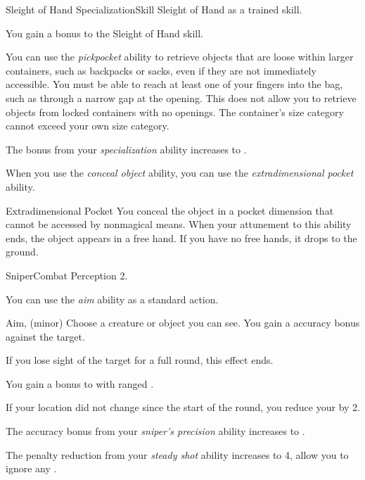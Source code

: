     \begin{feat}{Sleight of Hand Specialization}{Skill}
        \featpre Sleight of Hand as a trained skill.

         You gain a  bonus to the Sleight of Hand skill.

         You can use the \textit{pickpocket} ability to retrieve objects that are loose within larger containers, such as backpacks or sacks, even if they are not immediately accessible.
        You must be able to reach at least one of your fingers into the bag, such as through a narrow gap at the opening.
        This does not allow you to retrieve objects from locked containers with no openings.
        The container's size category cannot exceed your own size category.

         The bonus from your \textit{specialization} ability increases to .

         When you use the \textit{conceal object} ability, you can use the \textit{extradimensional pocket} ability.
        \begin{magicalattuneability}{Extradimensional Pocket}{}
            \rankline
            You conceal the object in a pocket dimension that cannot be accessed by nonmagical means.
            When your attunement to this ability ends, the object appears in a free hand.
            If you have no free hands, it drops to the ground.
        \end{magicalattuneability}
    \end{feat}

    \begin{feat}{Sniper}{Combat}
        \featpre Perception 2.

         You can use the \textit{aim} ability as a standard action.
        \begin{sustainability}{Aim}{,  (minor)}
            \rankline
            Choose a creature or object you can see.
            You gain a  accuracy bonus against the target.

            If you lose sight of the target for a full round, this effect ends.
        \end{sustainability}

         You gain a  bonus to  with ranged .

         If your location did not change since the start of the round, you reduce your  by 2.

         The accuracy bonus from your \textit{sniper's precision} ability increases to .

         The penalty reduction from your \textit{steady shot} ability increases to 4, allow you to ignore any .
    \end{feat}

